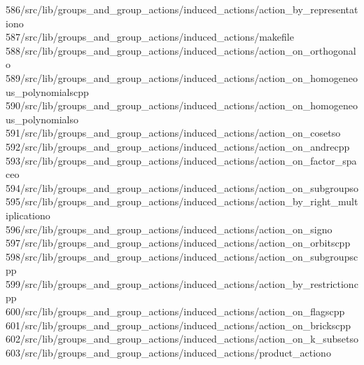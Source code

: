 \begin{tabbing}
586\>/src/lib/groups\_and\_group\_actions/induced\_actions/action\_by\_representationo\\[0pt]
587\>/src/lib/groups\_and\_group\_actions/induced\_actions/makefile\\[0pt]
588\>/src/lib/groups\_and\_group\_actions/induced\_actions/action\_on\_orthogonalo\\[0pt]
589\>/src/lib/groups\_and\_group\_actions/induced\_actions/action\_on\_homogeneous\_polynomialscpp\\[0pt]
590\>/src/lib/groups\_and\_group\_actions/induced\_actions/action\_on\_homogeneous\_polynomialso\\[0pt]
591\>/src/lib/groups\_and\_group\_actions/induced\_actions/action\_on\_cosetso\\[0pt]
592\>/src/lib/groups\_and\_group\_actions/induced\_actions/action\_on\_andrecpp\\[0pt]
593\>/src/lib/groups\_and\_group\_actions/induced\_actions/action\_on\_factor\_spaceo\\[0pt]
594\>/src/lib/groups\_and\_group\_actions/induced\_actions/action\_on\_subgroupso\\[0pt]
595\>/src/lib/groups\_and\_group\_actions/induced\_actions/action\_by\_right\_multiplicationo\\[0pt]
596\>/src/lib/groups\_and\_group\_actions/induced\_actions/action\_on\_signo\\[0pt]
597\>/src/lib/groups\_and\_group\_actions/induced\_actions/action\_on\_orbitscpp\\[0pt]
598\>/src/lib/groups\_and\_group\_actions/induced\_actions/action\_on\_subgroupscpp\\[0pt]
599\>/src/lib/groups\_and\_group\_actions/induced\_actions/action\_by\_restrictioncpp\\[0pt]
600\>/src/lib/groups\_and\_group\_actions/induced\_actions/action\_on\_flagscpp\\[0pt]
601\>/src/lib/groups\_and\_group\_actions/induced\_actions/action\_on\_brickscpp\\[0pt]
602\>/src/lib/groups\_and\_group\_actions/induced\_actions/action\_on\_k\_subsetso\\[0pt]
603\>/src/lib/groups\_and\_group\_actions/induced\_actions/product\_actiono\\[0pt]

\end{tabbing}
